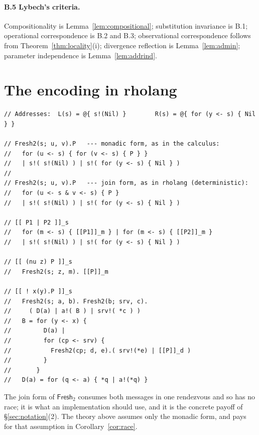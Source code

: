 \documentclass[11pt]{article}
\theoremstyle{definition}
\theoremstyle{plain}
\theoremstyle{remark}
\newcommand{\Frsh}{\mathsf{Fresh}_2}
\begin{document}
\paragraph{B.5 Lybech's criteria.}
Compositionality is Lemma~\ref{lem:compositional}; substitution
invariance is B.1; operational correspondence is B.2 and B.3;
observational correspondence follows from
Theorem~\ref{thm:locality}(i); divergence reflection is
Lemma~\ref{lem:admin}; parameter independence is
Lemma~\ref{lem:addrind}.

\section{The encoding in rholang}\label{app:rholang}

\begin{lstlisting}
// Addresses:  L(s) = @{ s!(Nil) }        R(s) = @{ for (y <- s) { Nil } }

// Fresh2(s; u, v).P   --- monadic form, as in the calculus:
//   for (u <- s) { for (v <- s) { P } }
//   | s!( s!(Nil) ) | s!( for (y <- s) { Nil } )
//
// Fresh2(s; u, v).P   --- join form, as in rholang (deterministic):
//   for (u <- s & v <- s) { P }
//   | s!( s!(Nil) ) | s!( for (y <- s) { Nil } )

// [[ P1 | P2 ]]_s
//   for (m <- s) { [[P1]]_m } | for (m <- s) { [[P2]]_m }
//   | s!( s!(Nil) ) | s!( for (y <- s) { Nil } )

// [[ (nu z) P ]]_s
//   Fresh2(s; z, m). [[P]]_m

// [[ ! x(y).P ]]_s
//   Fresh2(s; a, b). Fresh2(b; srv, c).
//     ( D(a) | a!( B ) | srv!( *c ) )
//   B = for (y <- x) {
//         D(a) |
//         for (cp <- srv) {
//           Fresh2(cp; d, e).( srv!(*e) | [[P]]_d )
//         }
//       }
//   D(a) = for (q <- a) { *q | a!(*q) }
\end{lstlisting}

\noindent
The join form of $\Frsh$ consumes both messages in one rendezvous and so
has no race; it is what an implementation should use, and it is the
concrete payoff of \S\ref{sec:notation}(2). The theory above assumes only
the monadic form, and pays for that assumption in
Corollary~\ref{cor:race}.
\end{document}
